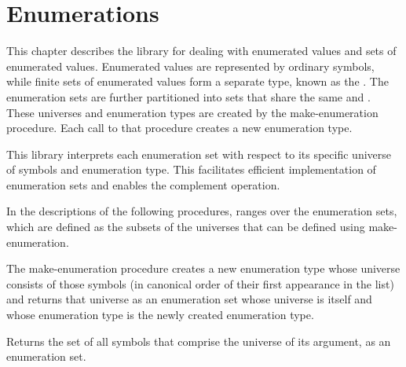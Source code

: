 \chapter{Enumerations}
\label{enumerationschapter}

This chapter describes the  library for dealing with enumerated values
and sets of enumerated values.  Enumerated
values are represented by ordinary symbols, while finite sets of
enumerated values form a separate type, known as the
.
The enumeration sets are further partitioned into sets that
share the same  and .
These universes and enumeration types are created by the
{\cf make-enumeration} procedure.  Each call to that procedure
creates a new enumeration type.

This library interprets each enumeration set with respect to
its specific universe of symbols and enumeration type.
This facilitates efficient implementation of enumeration sets
and enables the complement operation.

In the descriptions of the following procedures, 
ranges over the enumeration sets, which are defined as the subsets
of the universes that can be defined using {\cf make-enumeration}.

\begin{entry}{%
}

The {\cf make-\hp{}enumeration} procedure
creates a new enumeration type whose universe consists of
those symbols (in canonical order of their first appearance
in the list) and returns that universe as an enumeration
set whose universe is itself and whose enumeration type is
the newly created enumeration type.
\end{entry}

\begin{entry}{%
}

Returns the set of all symbols that comprise
the universe of its argument, as an enumeration set.
\end{entry}

